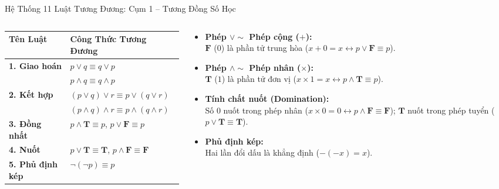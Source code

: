 \documentclass[aspectratio=169, 10pt]{beamer}
\begin{document}
\begin{frame}{Hệ Thống 11 Luật Tương Đương: Cụm 1 -- Tương Đồng Số Học}
  \begin{columns}[t, onlytextwidth]
    \begin{column}{0.54\textwidth}
      \begin{cozyDef}
        \centering
        \renewcommand{\arraystretch}{1.04}
        \small
        \setlength{\tabcolsep}{3pt}
        \begin{tabular}{ll}
          \toprule
          \textbf{Tên Luật} & \textbf{Công Thức Tương Đương} \\
          \midrule
          \textbf{1. Giao hoán} & $p \lor q \equiv q \lor p$ \\
                                & $p \land q \equiv q \land p$ \\
          \textbf{2. Kết hợp}   & $(p \lor q) \lor r \equiv p \lor (q \lor r)$ \\
                                & $(p \land q) \land r \equiv p \land (q \land r)$ \\
          \textbf{3. Đồng nhất} & $p \land \mathbf{T} \equiv p$, \quad $p \lor \mathbf{F} \equiv p$ \\
          \textbf{4. Nuốt}      & $p \lor \mathbf{T} \equiv \mathbf{T}$, \quad $p \land \mathbf{F} \equiv \mathbf{F}$ \\
          \textbf{5. Phủ định kép} & $\neg(\neg p) \equiv p$ \\
          \bottomrule
        \end{tabular}
      \end{cozyDef}
    \end{column}
    \begin{column}{0.43\textwidth}
      \begin{cozyInsight}
        \small
        \begin{itemize}
          \setlength{\itemsep}{1pt}
          \item \textbf{Phép $\lor \sim$ Phép cộng ($+$):}\\
          $\mathbf{F}$ ($0$) là phần tử trung hòa ($x + 0 = x \longleftrightarrow p \lor \mathbf{F} \equiv p$).
          \item \textbf{Phép $\land \sim$ Phép nhân ($\times$):}\\
          $\mathbf{T}$ ($1$) là phần tử đơn vị ($x \times 1 = x \longleftrightarrow p \land \mathbf{T} \equiv p$).
          \item \textbf{Tính chất nuốt (Domination):}\\
          Số $0$ nuốt trong phép nhân ($x \times 0 = 0 \longleftrightarrow p \land \mathbf{F} \equiv \mathbf{F}$); $\mathbf{T}$ nuốt trong phép tuyển ($p \lor \mathbf{T} \equiv \mathbf{T}$).
          \item \textbf{Phủ định kép:}\\
          Hai lần đổi dấu là khẳng định ($-(-x) = x$).
        \end{itemize}
      \end{cozyInsight}
    \end{column}
  \end{columns}
\end{frame}
\end{document}
